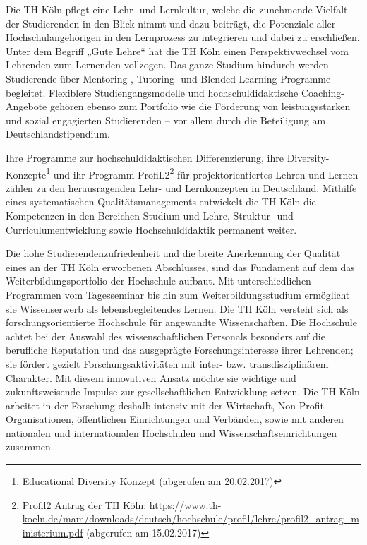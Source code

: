 Die TH Köln pflegt eine Lehr- und Lernkultur, welche die zunehmende
Vielfalt der Studierenden in den Blick nimmt und dazu beiträgt, die
Potenziale aller Hochschulangehörigen in den Lernprozess zu integrieren
und dabei zu erschließen. Unter dem Begriff „Gute Lehre`` hat die TH
Köln einen Perspektivwechsel vom Lehrenden zum Lernenden vollzogen. Das
ganze Studium hindurch werden Studierende über Mentoring-, Tutoring- und
Blended Learning-Programme begleitet. Flexiblere Studiengangsmodelle und
hochschuldidaktische Coaching-Angebote gehören ebenso zum Portfolio wie
die Förderung von leistungsstarken und sozial engagierten Studierenden
-- vor allem durch die Beteiligung am Deutschlandstipendium.

Ihre Programme zur hochschuldidaktischen Differenzierung, ihre
Diversity-Konzepte\footnote{\href{https://www.th-koeln.de/hochschule/educational-diversity_5710.php}{Educational
  Diversity Konzept} (abgerufen am 20.02.2017)} und ihr Programm
ProfiL2\footnote{Profil2 Antrag der TH Köln:
  \url{https://www.th-koeln.de/mam/downloads/deutsch/hochschule/profil/lehre/profil2\_antrag\_ministerium.pdf}
  (abgerufen am 15.02.2017)} für projektorientiertes Lehren und Lernen
zählen zu den herausragenden Lehr- und Lernkonzepten in Deutschland.
Mithilfe eines systematischen Qualitätsmanagements entwickelt die TH
Köln die Kompetenzen in den Bereichen Studium und Lehre, Struktur- und
Curriculumentwicklung sowie Hochschuldidaktik permanent weiter.

Die hohe Studierendenzufriedenheit und die breite Anerkennung der
Qualität eines an der TH Köln erworbenen Abschlusses, sind das Fundament
auf dem das Weiterbildungsportfolio der Hochschule aufbaut. Mit
unterschiedlichen Programmen vom Tagesseminar bis hin zum
Weiterbildungsstudium ermöglicht sie Wissenserwerb als
lebensbegleitendes Lernen. Die TH Köln versteht sich als
forschungsorientierte Hochschule für angewandte Wissenschaften. Die
Hochschule achtet bei der Auswahl des wissenschaftlichen Personals
besonders auf die berufliche Reputation und das ausgeprägte
Forschungsinteresse ihrer Lehrenden; sie fördert gezielt
Forschungsaktivitäten mit inter- bzw. transdisziplinärem Charakter. Mit
diesem innovativen Ansatz möchte sie wichtige und zukunftsweisende
Impulse zur gesellschaftlichen Entwicklung setzen. Die TH Köln arbeitet
in der Forschung deshalb intensiv mit der Wirtschaft,
Non-Profit-Organisationen, öffentlichen Einrichtungen und Verbänden,
sowie mit anderen nationalen und internationalen Hochschulen und
Wissenschaftseinrichtungen zusammen.

